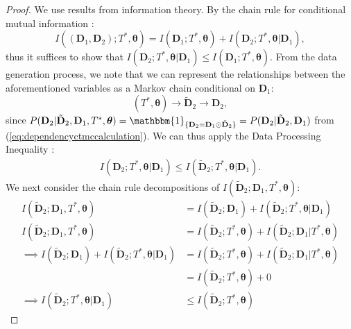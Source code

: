 \begin{proof}
We use results from information theory. By the chain rule for conditional mutual information \cite{Dobrushin1959}:
\begin{equation}
    I((\mathbf{D}_1, \mathbf{D}_2); T^*, \boldsymbol{\theta}) = I(\mathbf{D}_1; T^*, \boldsymbol{\theta}) + I(\mathbf{D}_2; T^*, \boldsymbol{\theta}|\mathbf{D}_1),
\end{equation}
thus it suffices to show that $I(\mathbf{D}_2; T^*, \boldsymbol{\theta}|\mathbf{D}_1) \leq I(\mathbf{D}_1; T^*, \boldsymbol{\theta})$. From the data generation process, we note that we can represent the relationships between the aforementioned variables as a Markov chain conditional on $\mathbf{D}_1$:
\begin{equation}
    (T^*, \boldsymbol{\theta}) \to \tilde{\mathbf{D}}_2 \to \mathbf{D}_2,
\end{equation}
since $P(\mathbf{D}_2|\tilde{\mathbf{D}}_2, \mathbf{D}_1, T^*, \boldsymbol{\theta}) = \mathbbm{1}_{\{\mathbf{D}_2 = \mathbf{D}_1 \odot \tilde{\mathbf{D}}_2\}} = P(\mathbf{D}_2|\tilde{\mathbf{D}}_2, \mathbf{D}_1)$ from (\ref{eq:dependencyctmccalculation}). We can thus apply the Data Processing Inequality \cite{Thomas2012}:
\begin{align}
    I(\mathbf{D}_2; T^*, \boldsymbol{\theta}|\mathbf{D}_1) \leq I(\tilde{\mathbf{D}}_2; T^*, \boldsymbol{\theta}|\mathbf{D}_1).
    \label{eq:dpi}
\end{align}
We next consider the chain rule decompositions of $I(\tilde{\mathbf{D}}_2; \mathbf{D}_1, T^*, \boldsymbol{\theta})$:
\begin{align}
   I(\tilde{\mathbf{D}}_2; \mathbf{D}_1, T^*, \boldsymbol{\theta}) &= I(\tilde{\mathbf{D}}_2; \mathbf{D}_1) + I(\tilde{\mathbf{D}}_2; T^*, \boldsymbol{\theta}|\mathbf{D}_1) \\
   I(\tilde{\mathbf{D}}_2; \mathbf{D}_1, T^*, \boldsymbol{\theta}) &= I(\tilde{\mathbf{D}}_2; T^*, \boldsymbol{\theta}) + I(\tilde{\mathbf{D}}_2; \mathbf{D}_1|T^*, \boldsymbol{\theta}) \\
   \implies I(\tilde{\mathbf{D}}_2; \mathbf{D}_1) + I(\tilde{\mathbf{D}}_2; T^*, \boldsymbol{\theta}|\mathbf{D}_1) &= I(\tilde{\mathbf{D}}_2; T^*, \boldsymbol{\theta}) + I(\tilde{\mathbf{D}}_2; \mathbf{D}_1|T^*, \boldsymbol{\theta}) \\
   &= I(\tilde{\mathbf{D}}_2; T^*, \boldsymbol{\theta}) + 0 \\
   \implies I(\tilde{\mathbf{D}}_2; T^*, \boldsymbol{\theta}|\mathbf{D}_1) &\leq I(\tilde{\mathbf{D}}_2; T^*, \boldsymbol{\theta})\label{eq:indepinfo}

\end{align}
\end{proof}
